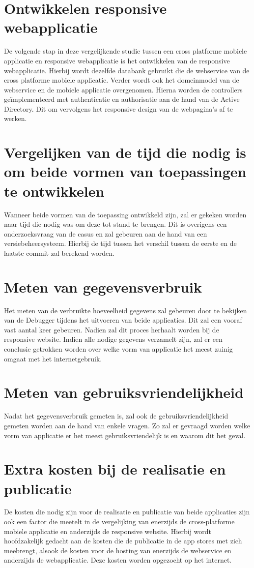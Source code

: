 \section{Ontwikkelen responsive webapplicatie}
De volgende stap in deze vergelijkende studie tussen een cross platforme mobiele applicatie en responsive webapplicatie is het
ontwikkelen van de responsive webapplicatie. Hierbij wordt dezelfde databank gebruikt die de webservice van de cross platforme
mobiele applicatie. Verder wordt ook het domeinmodel van de webservice en de mobiele applicatie overgenomen. Hierna worden de controllers
geïmplementeerd met authenticatie en authorisatie aan de hand van de Active Directory.
Dit om vervolgens het responsive design van de webpagina's af te werken.

\section{Vergelijken van de tijd die nodig is om beide vormen van toepassingen te ontwikkelen}
Wanneer beide vormen van de toepassing ontwikkeld zijn, zal er gekeken worden naar tijd die nodig was om deze tot stand te brengen.
Dit is overigens een onderzoeksvraag van de casus en zal gebeuren aan de hand van een versiebeheersysteem.
Hierbij de tijd tussen het verschil tussen de eerste en de laatste commit zal berekend worden.

\section{Meten van gegevensverbruik}
Het meten van de verbruikte hoeveelheid gegevens zal gebeuren door te bekijken van de Debugger tijdens het uitvoeren van beide
applicaties. Dit zal een vooraf vast aantal keer gebeuren.
Nadien zal dit proces herhaalt worden bij de responsive website. Indien alle nodige gegevens verzamelt zijn, zal er een conclusie
getrokken worden over welke vorm van applicatie het meest zuinig omgaat met het internetgebruik.

\section{Meten van gebruiksvriendelijkheid}
Nadat het gegevensverbruik gemeten is, zal ook de gebruiksvriendelijkheid gemeten worden aan de hand van enkele vragen.
Zo zal er gevraagd worden welke vorm van applicatie er het meest gebruiksvriendelijk is en waarom dit het geval.

\section{Extra kosten bij de realisatie en publicatie}
De kosten die nodig zijn voor de realisatie en publicatie van beide applicaties zijn ook een factor die meetelt in de vergelijking
van enerzijds de cross-platforme mobiele applicatie en anderzijds de responsive website. Hierbij wordt hoofdzakelijk gedacht aan
de kosten die de publicatie in de app stores met zich meebrengt, alsook de kosten voor de hosting van enerzijds de webservice en
anderzijds de webapplicatie. Deze kosten worden opgezocht op het internet.

